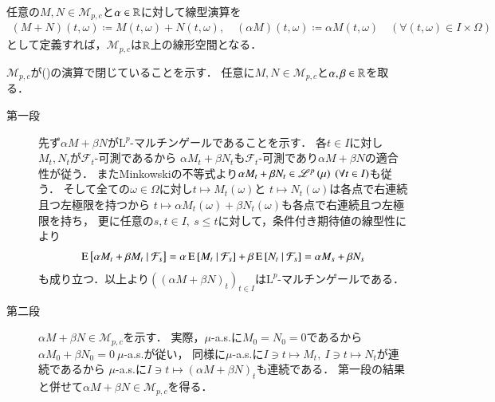 \newpage
	\begin{screen}
		\begin{lem}
			任意の$M,N \in \mathcal{M}_{p,c}$と$\alpha \in \mathbb{R}$に対して線型演算を
			\begin{align}
				(M + N)(t,\omega) \coloneqq M(t,\omega) + N(t,\omega), 
				\quad (\alpha M)(t,\omega) \coloneqq \alpha M(t,\omega)
				\quad (\forall (t,\omega) \in I \times \Omega)
				\label{eq:mart_linear_arithmetic_0}
			\end{align}
			として定義すれば，$\mathcal{M}_{p,c}$は$\mathbb{R}$上の線形空間となる．
		\end{lem}
	\end{screen}
	
	
	\begin{prf}
		$\mathcal{M}_{p,c}$が()の演算で閉じていることを示す．
		任意に$M,N \in \mathcal{M}_{p,c}$と$\alpha, \beta \in \mathbb{R}$を取る．
		\begin{description}
			\item[第一段]
				先ず$\alpha M + \beta N$が$\mathrm{L}^p$-マルチンゲールであることを示す．
				各$t \in I$に対し$M_t,N_t$が$\mathcal{F}_t$-可測であるから
				$\alpha M_t + \beta N_t$も$\mathcal{F}_t$-可測であり$\alpha M + \beta N$の適合性が従う．
				またMinkowskiの不等式より$\alpha M_t + \beta N_t \in \mathscr{L}^{p} \left(\mu\right)\ (\forall t \in I)$も従う．
				そして全ての$\omega \in \Omega$に対し$t \longmapsto M_t(\omega)$と
				$t \longmapsto N_t(\omega)$は各点で右連続且つ左極限を持つから
				$t \longmapsto \alpha M_t(\omega) + \beta N_t(\omega)$も各点で右連続且つ左極限を持ち，
				更に任意の$s,t \in I,\ s \leq t$に対して，条件付き期待値の線型性により
				\begin{align}
					\operatorname{E} \left[ \alpha M_t + \beta M_t \ \middle|\ \mathcal{F}_s \right] 
					= \alpha \operatorname{E} \left[ M_t \ \middle|\ \mathcal{F}_s \right] + \beta \operatorname{E} \left[ N_t \ \middle|\ \mathcal{F}_s \right] 
					= \alpha M_s + \beta N_s
				\end{align}
				も成り立つ．以上より$\left( (\alpha M + \beta N)_t \right)_{t \in I}$は$\mathrm{L}^p$-マルチンゲールである．
			
			\item[第二段]
				$\alpha M + \beta N \in \mathcal{M}_{p,c}$を示す．
				実際，$\mu$-a.s.に$M_0 = N_0 = 0$であるから$\alpha M_0 + \beta N_0 = 0\ \mu$-a.s.が従い，
				同様に$\mu$-a.s.に$I \ni t \longmapsto M_t,\ I \ni t \longmapsto N_t$が連続であるから
				$\mu$-a.s.に$I \ni t \longmapsto (\alpha M + \beta N)_t$も連続である．
				第一段の結果と併せて$\alpha M + \beta N \in \mathcal{M}_{p,c}$を得る．
				\QED
		\end{description}		
	\end{prf}
	
